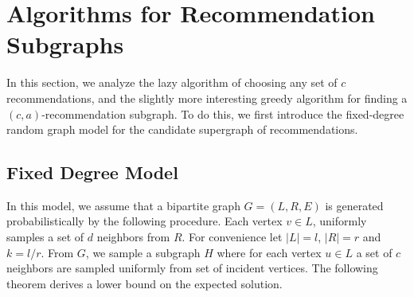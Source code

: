 \section{Algorithms for Recommendation Subgraphs}
In this section, we analyze the lazy algorithm of choosing any set of
$c$ recommendations, and the slightly more interesting greedy algorithm
for finding a $(c,a)$-recommendation subgraph. To do this, we first
introduce the fixed-degree random graph model for the candidate
supergraph of recommendations. 

\subsection{Fixed Degree Model}
\label{fixed-degree}

In this model, we assume that a bipartite graph $G=(L,R,E)$ is
generated probabilistically by the following procedure. Each
vertex $v\in L$, uniformly samples a set of $d$ neighbors
from $R$. For convenience let $|L|=l$, $|R|=r$ and $k=l/r$. From
$G$, we sample a subgraph $H$ where for each vertex $u\in L$ a set of
$c$ neighbors are sampled uniformly from set of incident vertices. The
following theorem derives a lower bound on the expected solution.





